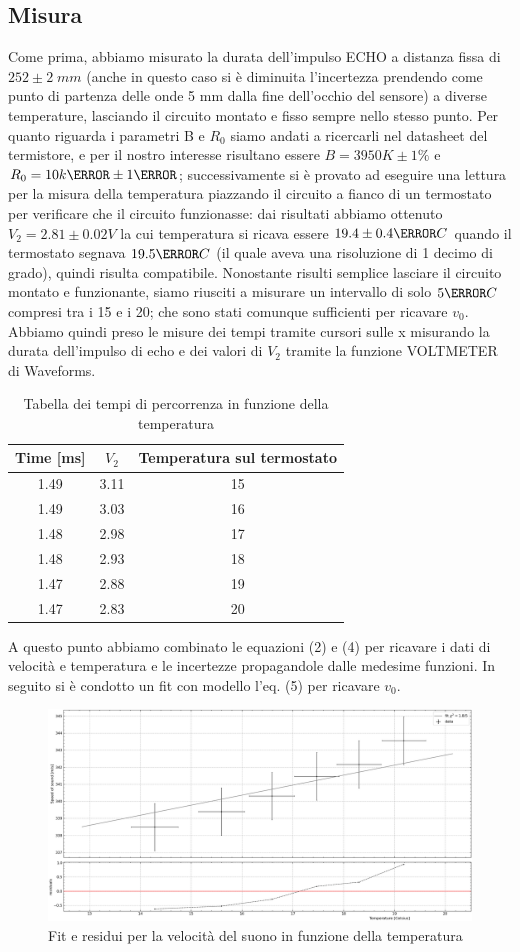 \documentclass[10pt, a4paper, italian]{article}
\begin{document}
\subsection{Misura}
Come prima, abbiamo misurato la durata dell'impulso ECHO a distanza fissa di $252 \pm 2 \; mm$ (anche in questo caso si è diminuita l'incertezza prendendo come punto di partenza delle onde 5 mm dalla fine dell'occhio del sensore) a diverse temperature, lasciando il circuito montato e fisso sempre nello stesso punto.
Per quanto riguarda i parametri B e $R_0$ siamo andati a ricercarli nel datasheet del termistore, e per il nostro interesse risultano essere $B=3950 K \pm 1 \percent$ e $R_0 = 10 k\ohm \pm 1 \percent$; successivamente si è provato ad eseguire una lettura per la misura della temperatura piazzando il circuito a fianco di un termostato per verificare che il circuito funzionasse: dai risultati abbiamo ottenuto $V_2=2.81 \pm 0.02 V$ la cui temperatura si ricava essere $19.4 \pm 0.4 \degree C$ quando il termostato segnava $19.5  \degree C$ (il quale aveva una risoluzione di 1 decimo di grado), quindi risulta compatibile.
Nonostante risulti semplice lasciare il circuito montato e funzionante, siamo riusciti a misurare un intervallo di solo $5 \degree C$ compresi tra i 15 e i 20; che sono stati comunque sufficienti per ricavare $v_0$. Abbiamo quindi preso le misure dei tempi tramite cursori sulle x misurando la durata dell'impulso di echo e dei valori di $V_2$ tramite la funzione VOLTMETER di Waveforms.
\begin{table}[H]
\centering
\begin{tabular}{ccc}
\toprule
Time [ms] & $V_2$ & Temperatura sul termostato \\
\midrule
1.49 & 3.11 & 15 \\
1.49 & 3.03 & 16 \\
1.48 & 2.98 & 17 \\
1.48 & 2.93 & 18 \\
1.47 & 2.88 & 19 \\
1.47 & 2.83 & 20
\end{tabular}
\caption{Tabella dei tempi di percorrenza in funzione della temperatura}
\end{table}
A questo punto abbiamo combinato le equazioni (2) e (4) per ricavare i dati di velocità e temperatura e le incertezze propagandole dalle medesime funzioni. In seguito si è condotto un fit con modello l'eq. (5) per ricavare $v_0$.
\begin{figure}[H]
    \centering
	\includegraphics[scale=0.3]{Temperature}
    \caption{Fit e residui per la velocità del suono in funzione della temperatura}
\end{figure}
\end{document}
